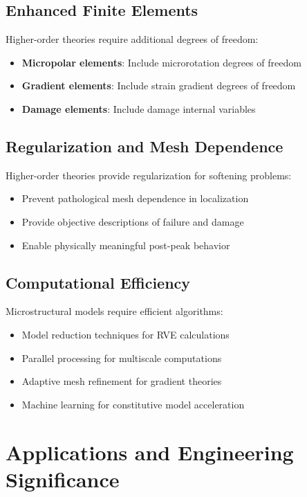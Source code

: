 \subsection{Enhanced Finite Elements}

Higher-order theories require additional degrees of freedom:
\begin{itemize}
\item \textbf{Micropolar elements}: Include microrotation degrees of freedom
\item \textbf{Gradient elements}: Include strain gradient degrees of freedom
\item \textbf{Damage elements}: Include damage internal variables
\end{itemize}

\subsection{Regularization and Mesh Dependence}

Higher-order theories provide regularization for softening problems:
\begin{itemize}
\item Prevent pathological mesh dependence in localization
\item Provide objective descriptions of failure and damage
\item Enable physically meaningful post-peak behavior
\end{itemize}

\subsection{Computational Efficiency}

Microstructural models require efficient algorithms:
\begin{itemize}
\item Model reduction techniques for RVE calculations
\item Parallel processing for multiscale computations
\item Adaptive mesh refinement for gradient theories
\item Machine learning for constitutive model acceleration
\end{itemize}

\section{Applications and Engineering Significance}

